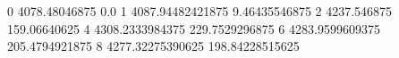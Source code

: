 0 4078.48046875 0.0
1 4087.94482421875 9.46435546875
2 4237.546875 159.06640625
4 4308.2333984375 229.7529296875
6 4283.9599609375 205.4794921875
8 4277.32275390625 198.84228515625
